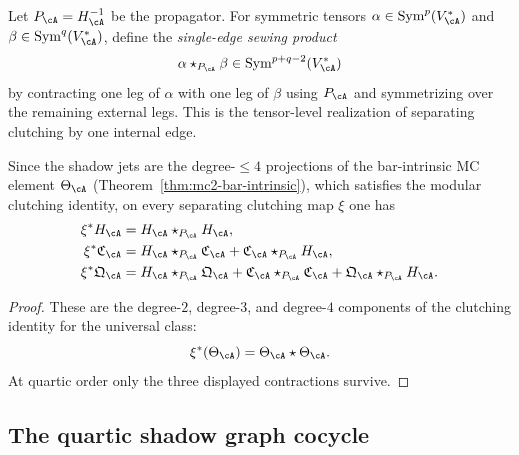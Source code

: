 \begin{construction}
\label{constr:nms-sewing-product}
Let $P_{\cA}=H_{\cA}^{-1}$ be the propagator. For symmetric tensors $\alpha\in \operatorname{Sym}^p(V_{\cA}^*)$ and $\beta\in \operatorname{Sym}^q(V_{\cA}^*)$, define the \emph{single-edge sewing product}
\[
\alpha\star_{P_{\cA}}\beta\in \operatorname{Sym}^{p+q-2}(V_{\cA}^*)
\]
by contracting one leg of $\alpha$ with one leg of $\beta$ using $P_{\cA}$ and symmetrizing over the remaining external legs. This is the tensor-level realization of separating clutching by one internal edge.
\end{construction}

\begin{theorem}
\label{thm:nms-separating-boundary-recursion}
Since the shadow jets are the degree-$\le 4$ projections of the bar-intrinsic MC element $\Theta_\cA$ \textup{(}Theorem~\textup{\ref{thm:mc2-bar-intrinsic})}, which satisfies the modular clutching identity, on every separating clutching map $\xi$ one has
\begin{align}
\xi^*H_{\cA}
&=
H_{\cA}\star_{P_{\cA}} H_{\cA},
\label{eq:nms-clutching-H}
\\
\xi^*\mathfrak C_{\cA}
&=
H_{\cA}\star_{P_{\cA}}\mathfrak C_{\cA}
+
\mathfrak C_{\cA}\star_{P_{\cA}} H_{\cA},
\label{eq:nms-clutching-C}
\\
\xi^*\mathfrak Q_{\cA}
&=
H_{\cA}\star_{P_{\cA}}\mathfrak Q_{\cA}
+
\mathfrak C_{\cA}\star_{P_{\cA}}\mathfrak C_{\cA}
+
\mathfrak Q_{\cA}\star_{P_{\cA}}H_{\cA}.
\label{eq:nms-clutching-Q}
\end{align}
\end{theorem}

\begin{proof}
These are the degree-$2$, degree-$3$, and degree-$4$ components of the clutching identity for the universal class:
\[
\xi^*(\Theta_{\cA})=\Theta_{\cA}\star \Theta_{\cA}.
\]
At quartic order only the three displayed contractions survive.\qedhere
\end{proof}

\subsection{The quartic shadow graph cocycle}
\label{subsec:nms-shadow-graph-complex}

